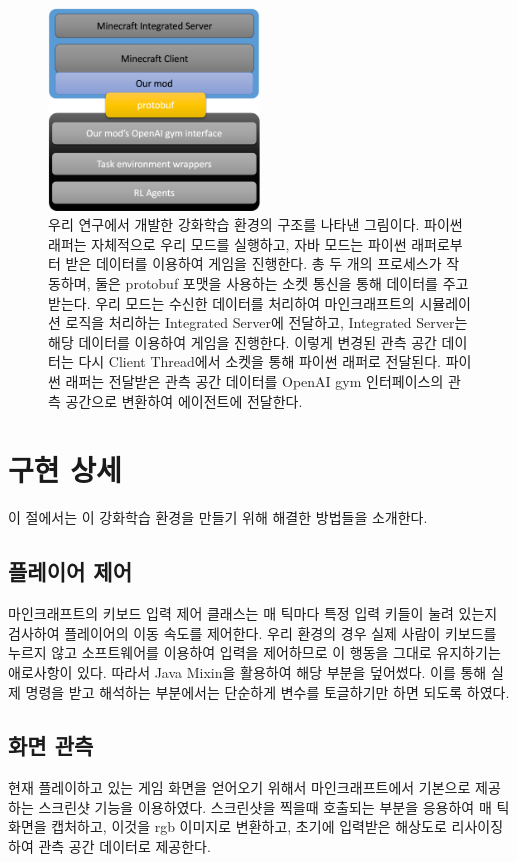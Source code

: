 \documentclass[oneside, under, ko]{snuthesis}
\begin{document}
\begin{figure}
    \centering
    \includegraphics[width=0.5\textwidth]{environment.png}
    \caption{우리 연구에서 개발한 강화학습 환경의 구조를 나타낸 그림이다. 파이썬 래퍼는 자체적으로 우리 모드를 실행하고, 자바 모드는 파이썬 래퍼로부터 받은 데이터를 이용하여 게임을 진행한다. 총 두 개의 프로세스가 작동하며, 둘은 protobuf 포맷을 사용하는 소켓 통신을 통해 데이터를 주고받는다. 우리 모드는 수신한 데이터를 처리하여 마인크래프트의 시뮬레이션 로직을 처리하는 Integrated Server에 전달하고, Integrated Server는 해당 데이터를 이용하여 게임을 진행한다. 이렇게 변경된 관측 공간 데이터는 다시 Client Thread에서 소켓을 통해 파이썬 래퍼로 전달된다. 파이썬 래퍼는 전달받은 관측 공간 데이터를 OpenAI gym 인터페이스의 관측 공간으로 변환하여 에이전트에 전달한다.}
    \label{fig:environment}
\end{figure}

\section{구현 상세}
이 절에서는 이 강화학습 환경을 만들기 위해 해결한 방법들을 소개한다.
\subsection{플레이어 제어}
마인크래프트의 키보드 입력 제어 클래스는 매 틱마다 특정 입력 키들이 눌려 있는지 검사하여 플레이어의 이동 속도를 제어한다. 우리 환경의 경우 실제 사람이 키보드를 누르지 않고 소프트웨어를 이용하여 입력을 제어하므로 이 행동을 그대로 유지하기는 애로사항이 있다. 따라서 Java Mixin을 활용하여 해당 부분을 덮어썼다. 이를 통해 실제 명령을 받고 해석하는 부분에서는 단순하게 변수를 토글하기만 하면 되도록 하였다.

\subsection{화면 관측}
현재 플레이하고 있는 게임 화면을 얻어오기 위해서 마인크래프트에서 기본으로 제공하는 스크린샷 기능을 이용하였다. 스크린샷을 찍을때 호출되는 부분을 응용하여 매 틱 화면을 캡처하고, 이것을 rgb 이미지로 변환하고, 초기에 입력받은 해상도로 리사이징하여 관측 공간 데이터로 제공한다.
\end{document}
